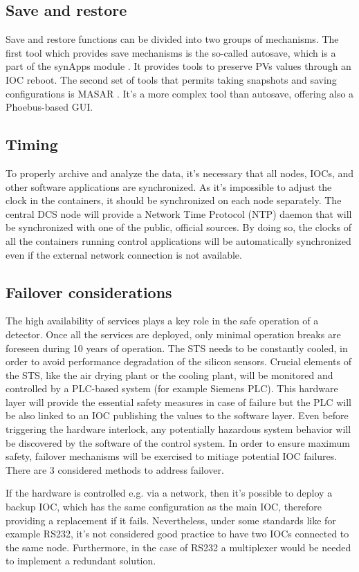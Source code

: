 \subsection{Save and restore}
Save and restore functions can be divided into two groups of mechanisms. The first tool which provides save mechanisms is the so-called autosave, which is a part of the synApps module \cite{autosave}. It provides tools to preserve PVs values through an IOC reboot. The second set of tools that permits taking snapshots and saving configurations is MASAR \cite{masar}. It's a more complex tool than autosave, offering also a Phoebus-based \gls{GUI}. 
\subsection{Timing}
To properly archive and analyze the data, it's necessary that all nodes, \gls{IOC}s, and other software applications are synchronized. As it's impossible to adjust the clock in the containers, it should be synchronized on each node separately. The central \gls{DCS} node will provide a Network Time Protocol (\gls{NTP}) daemon that will be synchronized with one of the public, official sources.  By doing so, the clocks of all the containers running control applications will be automatically synchronized even if the external network connection is not available. 
\subsection{Failover considerations}
The high availability of services plays a key role in the safe operation of a detector. Once all the services are deployed, only minimal operation breaks are foreseen during 10 years of operation. The STS needs to be constantly cooled, in order to avoid performance degradation of the silicon sensors.
Crucial elements of the STS, like the air drying plant or the cooling plant, will be monitored and controlled by a PLC-based system (for example Siemens PLC). This hardware layer will provide the essential safety measures in case of failure but the PLC will be also linked to an IOC publishing the values to the software layer. Even before triggering the hardware interlock, any potentially hazardous system behavior will be discovered by the software of the control system. In order to ensure maximum safety, failover mechanisms will be exercised to mitiage potential IOC failures. There are 3 considered methods to address failover. 


If the hardware is controlled e.g. via a network, then it's possible to deploy a backup IOC, which has the same configuration as the main IOC, therefore providing a replacement if it fails. Nevertheless, under some standards like for example RS232, it's not considered good practice to have two IOCs connected to the same node. Furthermore, in the case of RS232 a multiplexer would be needed to implement a redundant solution. 

